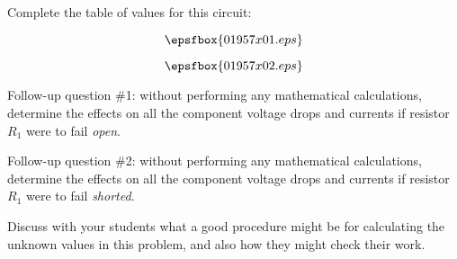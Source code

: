 

Complete the table of values for this circuit:

$$\epsfbox{01957x01.eps}$$







$$\epsfbox{01957x02.eps}$$

\vskip 10pt

Follow-up question \#1: without performing any mathematical calculations, determine the effects on all the component voltage drops and currents if resistor $R_1$ were to fail {\it open}.

\vskip 10pt

Follow-up question \#2: without performing any mathematical calculations, determine the effects on all the component voltage drops and currents if resistor $R_1$ were to fail {\it shorted}.







Discuss with your students what a good procedure might be for calculating the unknown values in this problem, and also how they might check their work.




